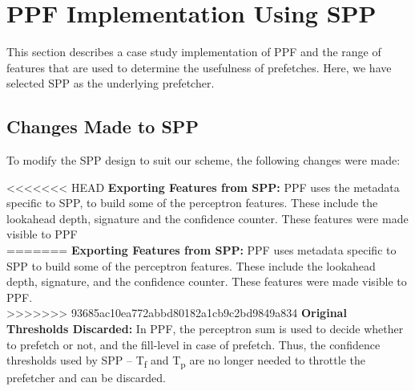 \section{PPF Implementation Using SPP}
\label{Impl}

This section describes a case study implementation of PPF and the
range of features that are used to determine the usefulness of
prefetches.  Here, we have selected SPP as the underlying prefetcher.

\subsection{Changes Made to SPP}
\label{Impl-Changes}
To modify the SPP design to suit our scheme, the following changes
were made:

<<<<<<< HEAD
\noindent \textbf{Exporting Features from SPP:} PPF uses the metadata 
specific to SPP, to build some of the perceptron features. These include
the lookahead depth, signature and the confidence counter. These features 
were made visible to PPF\\
=======
\noindent \textbf{Exporting Features from SPP:} PPF uses metadata 
specific to SPP to build some of the perceptron features. These include
the lookahead depth, signature, and the confidence counter. These features 
were made visible to PPF.\\
>>>>>>> 93685ac10ea772abbd80182a1cb9c2bd9849a834
%
\noindent \textbf{Original Thresholds Discarded:} In PPF, the
perceptron sum is used to decide whether to prefetch or not, and the
fill-level in case of prefetch.  Thus, the confidence thresholds used 
by SPP -- T\textsubscript{f} and T\textsubscript{p} are no longer needed to
throttle the prefetcher and can be discarded.
%
%
%
%
%

